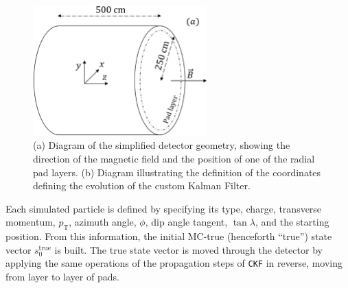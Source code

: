 \begin{figure}[t]
     \centering
         \includegraphics[width=0.6\textwidth]{figures/ch5-KF_NDGAr/Detector_diagram_new.eps}
        \caption{(a) Diagram of the simplified detector geometry, showing the direction of the magnetic field and the position of one of the radial pad layers. (b) Diagram illustrating the definition of the coordinates defining the evolution of the custom Kalman Filter. } \label{fig:DetectorFastSim}
\end{figure}

Each simulated particle is defined by specifying its type, charge, transverse momentum, $p_{\text{T}}$, azimuth angle, $\phi$, dip angle tangent, $\tan\lambda$, and the starting position. From this information, the initial MC-true (henceforth ``true'') state vector $s_0^{\text{true}}$ is built. The true state vector is moved through the detector by applying the same operations of the propagation steps of \texttt{CKF} in reverse, moving from layer to layer of pads.

